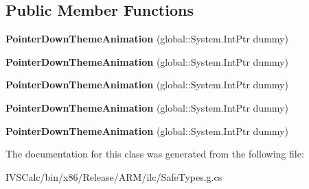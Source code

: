 \subsection*{Public Member Functions}
\begin{DoxyCompactItemize}
\item 
\mbox{\label{class_windows_1_1_u_i_1_1_xaml_1_1_media_1_1_animation_1_1_pointer_down_theme_animation_a2ca4d0eaae1961fcfbdbd59db75496e6}} 
{\bfseries Pointer\+Down\+Theme\+Animation} (global\+::\+System.\+Int\+Ptr dummy)
\item 
\mbox{\label{class_windows_1_1_u_i_1_1_xaml_1_1_media_1_1_animation_1_1_pointer_down_theme_animation_a2ca4d0eaae1961fcfbdbd59db75496e6}} 
{\bfseries Pointer\+Down\+Theme\+Animation} (global\+::\+System.\+Int\+Ptr dummy)
\item 
\mbox{\label{class_windows_1_1_u_i_1_1_xaml_1_1_media_1_1_animation_1_1_pointer_down_theme_animation_a2ca4d0eaae1961fcfbdbd59db75496e6}} 
{\bfseries Pointer\+Down\+Theme\+Animation} (global\+::\+System.\+Int\+Ptr dummy)
\item 
\mbox{\label{class_windows_1_1_u_i_1_1_xaml_1_1_media_1_1_animation_1_1_pointer_down_theme_animation_a2ca4d0eaae1961fcfbdbd59db75496e6}} 
{\bfseries Pointer\+Down\+Theme\+Animation} (global\+::\+System.\+Int\+Ptr dummy)
\item 
\mbox{\label{class_windows_1_1_u_i_1_1_xaml_1_1_media_1_1_animation_1_1_pointer_down_theme_animation_a2ca4d0eaae1961fcfbdbd59db75496e6}} 
{\bfseries Pointer\+Down\+Theme\+Animation} (global\+::\+System.\+Int\+Ptr dummy)
\end{DoxyCompactItemize}


The documentation for this class was generated from the following file\+:\begin{DoxyCompactItemize}
\item 
I\+V\+S\+Calc/bin/x86/\+Release/\+A\+R\+M/ilc/Safe\+Types.\+g.\+cs\end{DoxyCompactItemize}
